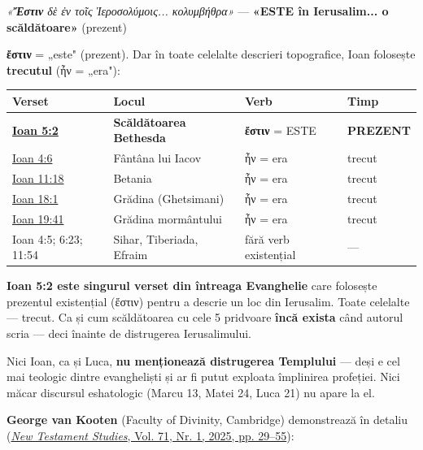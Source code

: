 \documentclass[12pt,a4paper,twoside,openany]{book}
\begin{document}
\textit{«\textbf{Ἔστιν} δὲ ἐν τοῖς Ἱεροσολύμοις... κολυμβήθρα»} — \textbf{«ESTE în Ierusalim... o scăldătoare»} (prezent)

\textbf{ἔστιν} = „este" (prezent). Dar în toate celelalte descrieri topografice, Ioan folosește \textbf{trecutul} (ἦν = „era"):

\begin{center}
\small
\begin{tabular}{L{4.2cm}L{4.8cm}L{4.2cm}L{1.4cm}}
\toprule
{}
\textbf{Verset} & \textbf{Locul} & \textbf{Verb} & \textbf{Timp} \\
\midrule
{}
\textbf{\href{https://bibliaortodoxa.ro/carte.php?id=35\&cap=5\#2}{Ioan 5:2}} & \textbf{Scăldătoarea Bethesda} & \textbf{ἔστιν} = ESTE & \textbf{PREZENT} \\
\href{https://bibliaortodoxa.ro/carte.php?id=35\&cap=4\#6}{Ioan 4:6} & Fântâna lui Iacov & ἦν = era & trecut \\
\href{https://bibliaortodoxa.ro/carte.php?id=35\&cap=11\#18}{Ioan 11:18} & Betania & ἦν = era & trecut \\
\href{https://bibliaortodoxa.ro/carte.php?id=35\&cap=18\#1}{Ioan 18:1} & Grădina (Ghetsimani) & ἦν = era & trecut \\
\href{https://bibliaortodoxa.ro/carte.php?id=35\&cap=19\#41}{Ioan 19:41} & Grădina mormântului & ἦν = era & trecut \\
Ioan 4:5; 6:23; 11:54 & Sihar, Tiberiada, Efraim & fără verb existențial & — \\
\bottomrule
\end{tabular}
\end{center}
\normalsize
\textbf{Ioan 5:2 este singurul verset din întreaga Evanghelie} care folosește prezentul existențial (ἔστιν) pentru a descrie un loc din Ierusalim. Toate celelalte — trecut. Ca și cum scăldătoarea cu cele 5 pridvoare \textbf{încă exista} când autorul scria — deci înainte de distrugerea Ierusalimului.

Nici Ioan, ca și Luca, \textbf{nu menționează distrugerea Templului} — deși e cel mai teologic dintre evangheliști și ar fi putut exploata împlinirea profeției. Nici măcar discursul eshatologic (Marcu 13, Matei 24, Luca 21) nu apare la el.

\textbf{George van Kooten} (Faculty of Divinity, Cambridge) demonstrează în detaliu (\href{https://doi.org/10.1017/S0028688524000213}{\textit{New Testament Studies}, Vol. 71, Nr. 1, 2025, pp. 29–55}):
\end{document}
